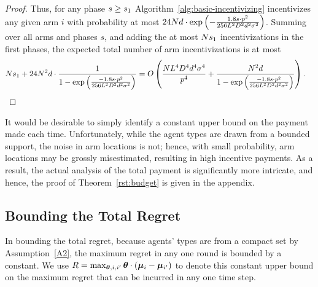 \begin{proof}
Thus, for any phase $s \geq s_1$
Algorithm~\ref{alg:basic-incentivizing} incentivizes any given arm $i$
with probability at most
$24 N d \cdot \exp \left(
  -\frac{1.8 s \cdot p^2}{256 L^2 D^2 d^2 \sigma^2}
\right)$.
Summing over all arms and phases $s$,
and adding the at most $N s_1$ incentivizations in
the first \EvenLaterPhase phases, 
the expected total number of arm incentivizations is at most
\begin{align*}
N s_1
  + 24 N^2 d \cdot \frac{1}{1 - \exp \left(
    \frac{-1.8 s \cdot p^2}{256 L^2 D^2 d^2 \sigma^2}
  \right)}
& = O\left( \frac{N L^4 D^4 d^4 \sigma^4}{p^4}
  + \frac{N^2 d}{1 - \exp \left(
    \frac{-1.8 s \cdot p^2}{256 L^2 D^2 d^2 \sigma^2}
  \right)} \right).
\end{align*}

\end{proof}

It would be desirable to simply identify a constant upper bound on the
payment made each time.
Unfortunately, while the agent types are drawn from a bounded support,
the noise in arm locations is not;
hence, with small probability, arm locations may be grossly
misestimated, resulting in high incentive payments.
As a result, the actual analysis of the total payment is significantly more
intricate, and hence,
the proof of Theorem~\ref{rst:budget} is given in the appendix.


\subsection{Bounding the Total Regret}
In bounding the total regret, because agents' types are from a compact
set by Assumption~\ref{A2}, the maximum regret in any one round is
bounded by a constant.
We use $R = \max_{\bm{\theta}, i,i'} \bm{\theta} \cdot (\bm{\mu}_{i} - \bm{\mu}_{i'})$
to denote this constant upper bound on the maximum regret that can be
incurred in any one time step. 



